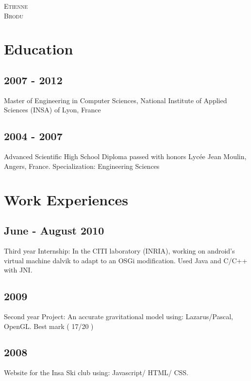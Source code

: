 


\pagestyle{empty}

	{
		\LARGE{\textsc{Etienne}\\
				\textsc{Brodu}}
	}
	
	
	
\section{Education}
	\subsection{2007 - 2012}
		{Master of Engineering in Computer Sciences, National Institute of Applied Sciences (INSA) of Lyon, France}
		
	\subsection{2004 - 2007}
		{Advanced Scientific High School Diploma passed with honors Lyc\'{e}e Jean Moulin, Angers, France. Specialization: Engineering Sciences}

\section{Work Experiences}
	\subsection{June - August 2010}
		{Third year Internship: In the CITI laboratory (INRIA), working on android's virtual machine dalvik to adapt to an OSGi modification. Used Java and C/C++ with JNI.}

	\subsection{2009}
		{Second year Project: An accurate gravitational model using: Lazarus/Pascal, OpenGL. Best mark ( 17/20 )}
		
	\subsection{2008}
		{Website for the Insa Ski club using: Javascript/ HTML/ CSS.}
				
